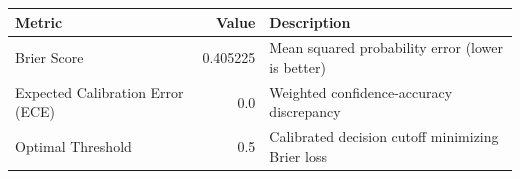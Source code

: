 \begin{tabular}{lrl}
\toprule
Metric & Value & Description \\
\midrule
Brier Score & 0.405225 & Mean squared probability error (lower is better) \\
Expected Calibration Error (ECE) & 0.0 & Weighted confidence-accuracy discrepancy \\
Optimal Threshold & 0.5 & Calibrated decision cutoff minimizing Brier loss \\
\bottomrule
\end{tabular}
